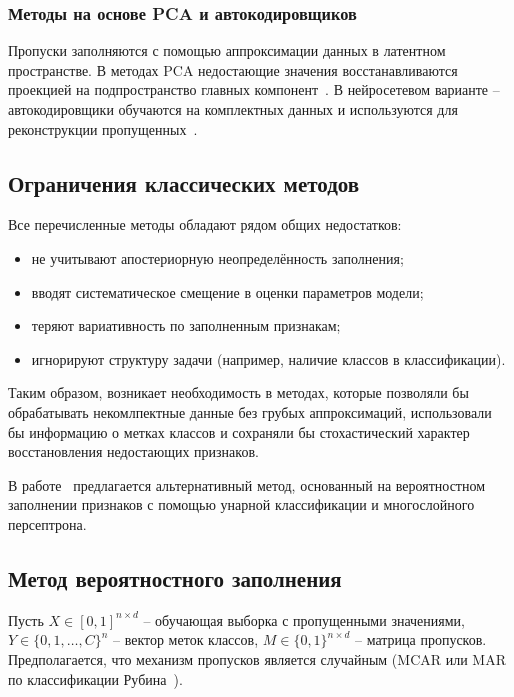 \subsubsection{Методы на основе PCA и автокодировщиков}

Пропуски заполняются с помощью аппроксимации данных в латентном пространстве. В методах PCA недостающие значения восстанавливаются проекцией на подпространство главных компонент~\cite{moh2024missing}. В нейросетевом варианте -- автокодировщики обучаются на комплектных данных и используются для реконструкции пропущенных~\cite{roskams2023leveraging}.

\subsection{Ограничения классических методов}

Все перечисленные методы обладают рядом общих недостатков:
\begin{itemize}
    \item не учитывают апостериорную неопределённость заполнения;
    \item вводят систематическое смещение в оценки параметров модели;
    \item теряют вариативность по заполненным признакам;
    \item игнорируют структуру задачи (например, наличие классов в классификации).
\end{itemize}

Таким образом, возникает необходимость в методах, которые позволяли бы обрабатывать некомлпектные данные без грубых аппроксимаций, использовали бы информацию о метках классов и сохраняли бы стохастический характер восстановления недостающих признаков.

В работе~\cite{perminov2025missing} предлагается альтернативный метод, основанный на вероятностном заполнении признаков с помощью унарной классификации и многослойного персептрона.

\subsection{Метод вероятностного заполнения}

Пусть \(X \in [0, 1]^{n \times d}\) -- обучающая выборка с пропущенными значениями, \(Y \in \{0, 1, \dots, C\}^n\) -- вектор меток классов, \(M \in \{0, 1\}^{n \times d}\) -- матрица пропусков. Предполагается, что механизм пропусков является случайным (MCAR или MAR по классификации Рубина~\cite{little1995statistical}).

